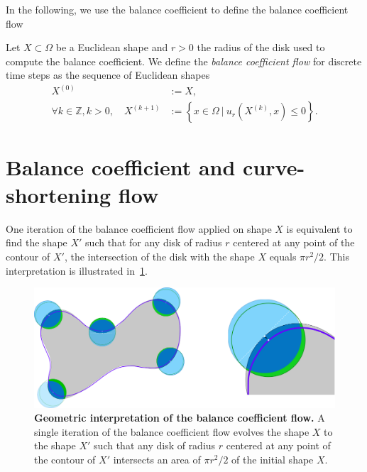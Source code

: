 \documentclass[review]{siamart220329}
\newcommand{\Z}{\mathbb{Z}}
\begin{document}
In the following, we use the balance coefficient to define the balance
coefficient flow 

\begin{definition}
Let $X \subset \Omega$ be a Euclidean shape and $r>0$ the radius of the disk
used to compute the balance coefficient. We define the \emph{balance
coefficient flow} for discrete time steps as the sequence of Euclidean
shapes
%
%
\begin{align}
  X^{(0)} & := X, \nonumber \\
  \forall k \in \Z, k > 0, \quad X^{(k+1)} & := \left\{ x \in \Omega \: | \: u_r(X^{(k)}, x) \leq 0 \right\}. \label{eq-balance-coefficient-flow}
\end{align}
%
%
\end{definition}
%
%
\section{Balance coefficient and curve-shortening flow}\label{sec:balance-coefficient-and-csf}
%
%
One iteration of the balance coefficient flow applied on shape $X$ is
equivalent to find the shape $X'$ such that for any disk of radius $r$ centered
at any point of the contour of $X'$, the intersection of the disk with the
shape $X$ equals $\pi r^2/2$. This interpretation is illustrated
in~\cref{fig:geometric-interpretation}.
%
% 
\begin{figure}
\center
\includegraphics[scale=0.25]{figures/zero-level-set/geometric-interpretation.png}
\caption{\textbf{Geometric interpretation of the balance coefficient flow.} A
single iteration of the balance coefficient flow evolves the shape $X$ to
the shape $X'$ such that any disk of radius $r$ centered at any point of the
contour of $X'$ intersects  an area of $\pi r^2/2$ of the initial shape
$X$.}
\label{fig:geometric-interpretation}
\end{figure}
% 
%
\end{document}
